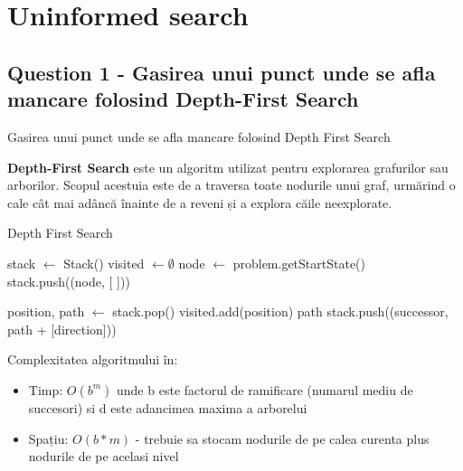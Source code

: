 \section{Uninformed search}
\subsection{Question 1 - Gasirea unui punct unde se afla mancare folosind Depth-First Search}
\par Gasirea unui punct unde se afla mancare folosind Depth First Search
\par \textbf{Depth-First Search} este un algoritm utilizat pentru explorarea grafurilor sau arborilor. Scopul acestuia este de a traversa toate nodurile unui graf, urmărind o cale cât mai adâncă înainte de a reveni și a explora căile neexplorate.

\begin{algorithm}
\caption{Depth First Search}
\begin{algorithmic}[1]
    \State stack $\gets$ Stack()
    \State visited $\gets \emptyset$
    \State node $\gets$ problem.getStartState()
    \State stack.push((node, [ ]))
    
        \State position, path $\gets$ stack.pop()
            \State visited.add(position)
                \Return path
            \EndIf
                    \State stack.push((successor, path + [direction]))
                \EndIf
            \EndFor
        \EndIf
    \EndWhile \\
    \Return [ ]
\EndFunction
\end{algorithmic}
\end{algorithm}

\par Complexitatea algoritmului în:

\begin{itemize}
    \item Timp: $O(b^m)$ unde b este factorul de ramificare (numarul mediu de succesori) si d este adancimea maxima a arborelui
    \item Spațiu: $O(b*m)$ - trebuie sa stocam nodurile de pe calea curenta plus nodurile de pe acelasi nivel 
\end{itemize}

